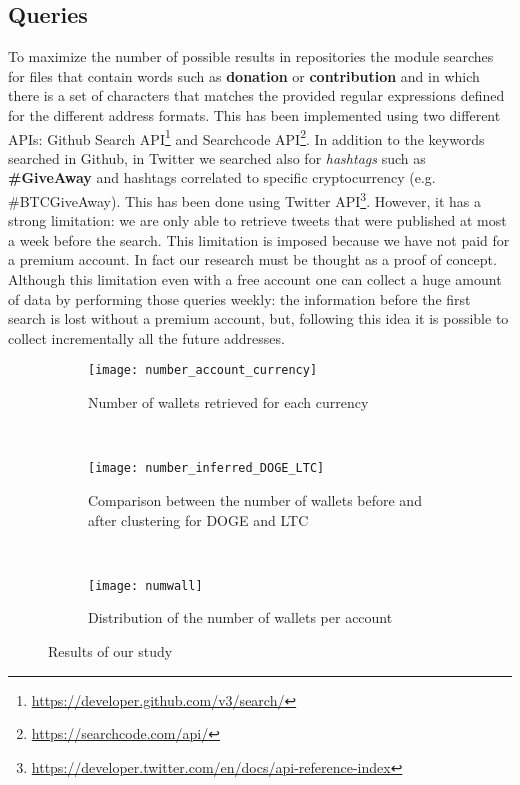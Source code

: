 \subsection{Queries}
\label{sec:queries}
To maximize the number of possible results in repositories the module
\walletcollector{} searches for files that contain words such as
\textbf{donation} or \textbf{contribution} and in which there is a set of
characters that matches the provided regular expressions defined for the
different address formats. This has been implemented using two different APIs:
Github Search API\footnote{\url{https://developer.github.com/v3/search/}} and
Searchcode API\footnote{\url{https://searchcode.com/api/}}.
In addition to the keywords searched in Github, in Twitter we searched also for
\textit{hashtags} such as \textbf{\#GiveAway} and
hashtags correlated to specific cryptocurrency (e.g. \#BTCGiveAway). This has
been done using Twitter
API\footnote{\url{https://developer.twitter.com/en/docs/api-reference-index}}.
However, it has a strong limitation: we are only able to retrieve tweets that
were published at most a week before the search. This limitation is imposed
because we have not paid for a premium account. In fact our research must be
thought as a proof of concept.
Although this limitation even with a free account one can collect a huge amount
of data by performing those queries weekly:
the information before the first search is lost without a premium account, but,
following this idea it is possible to collect incrementally all the future
addresses.

\begin{figure*}[ht!]
\centering
\begin{subfigure}[t]{0.3\textwidth}
\centering
\texttt{[image: number\_account\_currency]}
\caption{Number of wallets retrieved for each currency}
\label{fig:numberaccountcurrency}
\end{subfigure}
~
\begin{subfigure}[t]{0.3\textwidth}
\texttt{[image: number\_inferred\_DOGE\_LTC]}
\caption{Comparison between the number of wallets before and after clustering
for DOGE and LTC}
\label{fig:dogeltcclustered}
\end{subfigure}
~
\begin{subfigure}[t]{0.3\textwidth}
\centering
\texttt{[image: numwall]}
\caption{Distribution of the number of wallets per account}
\label{fig:numwall}
\end{subfigure}
\caption{Results of our study}
\end{figure*}

